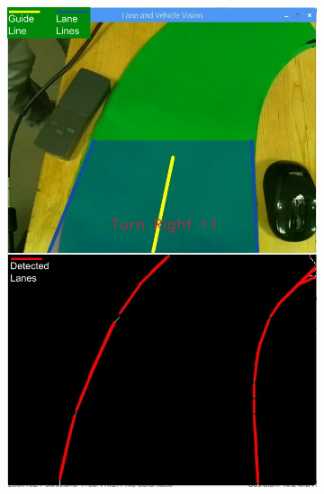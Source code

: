 \documentclass[a4paper,12pt]{article}
\begin{document}
	\begin{figure}[H]
		\setlength{\unitlength}{\textwidth} 
		\centering
		\begin{subfigure}{.5\textwidth}
	  		\centering
	  		\includegraphics[width=0.48\unitlength]{images/detection1-legend}
	  		\caption{\label{fig:detection-case1} }
		\end{subfigure}%
		\begin{subfigure}{.5\textwidth}
	  		\centering

\end{subfigure}
\end{figure}
\end{document}
